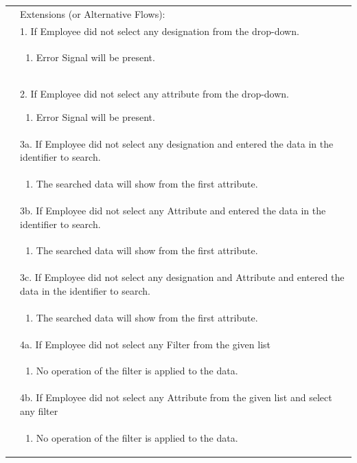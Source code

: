 \documentclass[12pt,a4paper]{report}
\begin{document}
\begin{tabular}{ | m{3cm} | m{12cm}| } \hline

&Extensions (or Alternative Flows):\\

& 1. If Employee did not select any designation from the drop-down. \\
& \begin{enumerate}
		\item Error Signal will be present.
	\end{enumerate}
\\ 

      & 2. If Employee did not select any attribute from the drop-down.
 	\begin{enumerate}
		\item Error Signal will be present.
	\end{enumerate}
\\ 
& 3a. If Employee did not select any designation and entered the data in the identifier to search. \\
& \begin{enumerate}
		\item The searched data will show from the first attribute.
	\end{enumerate}
\\
& 3b. If Employee did not select any Attribute and entered the data in the identifier to search. \\
& \begin{enumerate}
		\item The searched data will show from the first attribute.
	\end{enumerate}
\\ 
& 3c. If Employee did not select any designation and  Attribute and entered the data in the identifier to search. \\
& \begin{enumerate}
		\item The searched data will show from the first attribute.
	\end{enumerate}
\\ 

& 4a. If Employee did not select any Filter from the given list \\
& \begin{enumerate}
		\item No operation of the filter is applied to the data.
	\end{enumerate}
\\ 
& 4b. If Employee did not select any Attribute from the given list and select any filter  \\
& \begin{enumerate}
		\item No operation of the filter is applied to the data.
	\end{enumerate}
\\ 


\end{tabular}
\end{document}
